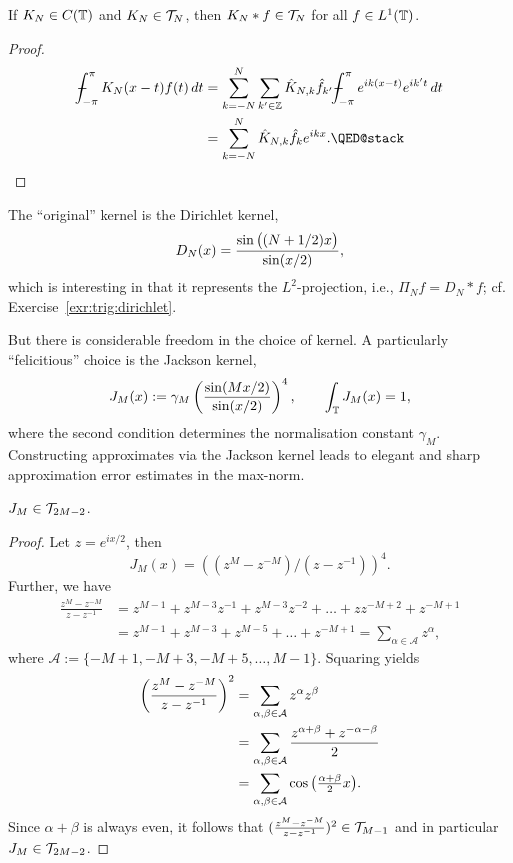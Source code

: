 \begin{lemma}
  If $K_N \in C(\mathbb{T})$ and $K_N \in \mathcal{T}_N$, then $K_N \ast f \in \mathcal{T}_N$ for
  all $f \in L^1(\mathbb{T})$.
\end{lemma}
\begin{proof}
  \begin{align*}
    \mint_{-\pi}^\pi K_N(x-t) f(t) \,dt
    &=
    \sum_{k =  -N}^N \sum_{k' \in \Z}
        \hat{K}_{N,k} \hat{f}_{k'} \mint_{-\pi}^\pi e^{ik(x-t)} e^{ik't}\,dt
    \\ &=
    \sum_{k = -N}^N \hat{K}_{N,k} \hat{f}_{k} e^{ikx}. \qedhere
  \end{align*}
\end{proof}


The ``original'' kernel is the Dirichlet kernel,
\[
    D_N(x) = \frac{\sin\big( (N+1/2) x \big)}{ \sin(x/2) },
\]
which is interesting in that it represents the $L^2$-projection, i.e.,
$\Pi_N f = D_N \ast f$; cf. Exercise~\ref{exr:trig:dirichlet}.

But there is considerable freedom in the choice of kernel. A particularly
``felicitious'' choice is the Jackson kernel,
\[
    J_M(x) := \gamma_M \left( \frac{\sin( Mx/2)}{\sin(x/2)} \right)^4,
    \qquad
    \int_{\mathbb{T}} J_M(x) = 1,
\]
where the second condition determines the normalisation constant $\gamma_M$.
Constructing approximates via the Jackson kernel leads to elegant and
sharp approximation error estimates in the max-norm.

\begin{lemma}
  $J_M \in \mathcal{T}_{2M-2}$.
\end{lemma}
\begin{proof}
  Let $z = e^{ix/2}$, then
  \[
      J_M(x)
      =
      \left((z^M - z^{-M}) / (z - z^{-1})\right)^4.
  \]
  Further, we have
  \begin{align*}
    \frac{z^M - z^{-M}}{z - z^{-1}}
    &= z^{M-1} + z^{M-3} z^{-1} + z^{M-3} z^{-2} + \dots
      + z z^{-M+2} + z^{-M+1} \\
    &= z^{M-1} + z^{M-3} + z^{M-5} + \dots + z^{-M+1}
    = \sum_{\alpha \in \mathcal{A}} z^\alpha,
  \end{align*}
  where $\mathcal{A} := \{-M+1, -M+3, -M+5, \dots, M-1\}$. Squaring yields
  \begin{align*}
     \left(\frac{z^M - z^{-M}}{z - z^{-1}} \right)^2
     &=
     \sum_{\alpha, \beta \in \mathcal{A}}
     z^\alpha z^{\beta} \\
     &= \sum_{\alpha, \beta \in \mathcal{A}}
     \frac{z^{\alpha +\beta} + z^{-\alpha-\beta}}{2} \\
     &= \sum_{\alpha, \beta \in \mathcal{A}} \cos\big( {\textstyle \frac{\alpha+\beta}{2}} x \big).
   \end{align*}
   Since $\alpha+\beta$ is always even, it follows that
   $(\frac{z^M - z^{-M}}{z - z^{-1}} )^2 \in \mathcal{T}_{M-1}$ and in particular
   $J_M \in \mathcal{T}_{2M-2}$.
\end{proof}



